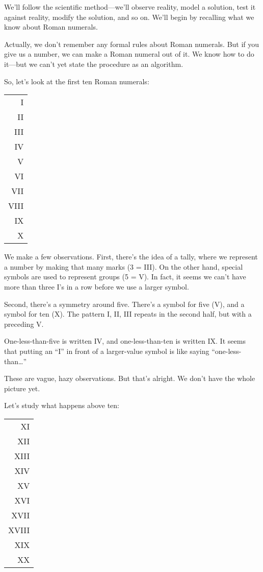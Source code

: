 We'll follow the scientific method---we'll observe reality, model a
solution, test it against reality, modify the solution, and so on. We'll
begin by recalling what we know about Roman numerals.

Actually, we don't remember any formal rules about Roman
numerals. But if you give us a number, we can make a Roman numeral
out of it. We know how to do it---but we can't yet state the procedure as
an algorithm.

So, let's look at the first ten Roman numerals:

\medskip
{\sf\begin{tabular}{r}
I \\
II \\
III \\
IV \\
V \\
VI \\
VII \\
VIII \\
IX \\
X \\
\end{tabular}}
\medskip

\noindent We make a few observations. First, there's the idea of a
tally, where we represent a number by making that many marks (3 =
III). On the other hand, special symbols are used to represent groups
(5 = V). In fact, it seems we can't have more than three I's in a row
before we use a larger symbol.

Second, there's a symmetry around five. There's a symbol for five (V), and
a symbol for ten (X). The pattern I, II, III repeats in the second half,
but with a preceding V.

One-less-than-five is written IV, and one-less-than-ten is written IX.
It seems that putting an ``I'' in front of a larger-value symbol is like
saying ``one-less-than\dots{}''

These are vague, hazy observations. But that's alright. We don't
have the whole picture yet.

Let's study what happens above ten:

\medskip
{\sf\begin{tabular}{r}
XI \\
XII \\
XIII \\
XIV \\
XV \\
XVI \\
XVII \\
XVIII \\
XIX \\
XX \\
\end{tabular}}

